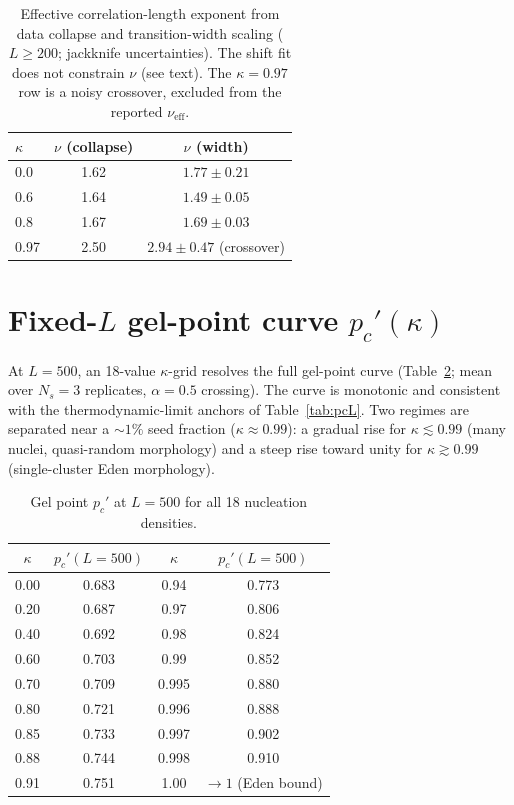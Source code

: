\documentclass[aps,prl,twocolumn,superscriptaddress,floatfix,nofootinbib]{revtex4-2}
\newcommand{\pcp}{p_c'}
\newcommand{\kap}{\kappa}
\newcommand{\nueff}{\nu_{\mathrm{eff}}}
\begin{document}
\begin{table}[h]
\centering
\caption{Effective correlation-length exponent from data collapse and transition-width scaling
($L\ge200$; jackknife uncertainties). The shift fit does not constrain $\nu$ (see text). The
$\kap=0.97$ row is a noisy crossover, excluded from the reported $\nueff$.}
\label{tab:nu}
\begin{tabular}{lcc}
\toprule
$\kap$ & $\nu$ (collapse) & $\nu$ (width) \\
\midrule
0.0  & 1.62 & $1.77\pm0.21$ \\
0.6  & 1.64 & $1.49\pm0.05$ \\
0.8  & 1.67 & $1.69\pm0.03$ \\
0.97 & 2.50 & $2.94\pm0.47$ \;(crossover) \\
\bottomrule
\end{tabular}
\end{table}

\section{Fixed-$L$ gel-point curve $\pcp(\kap)$}
At $L=500$, an 18-value $\kap$-grid resolves the full gel-point curve (Table~\ref{tab:kappa}; mean
over $N_s=3$ replicates, $\alpha=0.5$ crossing). The curve is monotonic and consistent with the
thermodynamic-limit anchors of Table~\ref{tab:pcL}. Two regimes are separated near a $\sim1\%$ seed
fraction ($\kap\approx0.99$): a gradual rise for $\kap\lesssim0.99$ (many nuclei, quasi-random
morphology) and a steep rise toward unity for $\kap\gtrsim0.99$ (single-cluster Eden morphology).

\begin{table}[h]
\centering
\caption{Gel point $\pcp$ at $L=500$ for all 18 nucleation densities.}
\label{tab:kappa}
\begin{tabular}{cc@{\hspace{2em}}cc}
\toprule
$\kap$ & $\pcp(L{=}500)$ & $\kap$ & $\pcp(L{=}500)$ \\
\midrule
0.00 & 0.683 & 0.94  & 0.773 \\
0.20 & 0.687 & 0.97  & 0.806 \\
0.40 & 0.692 & 0.98  & 0.824 \\
0.60 & 0.703 & 0.99  & 0.852 \\
0.70 & 0.709 & 0.995 & 0.880 \\
0.80 & 0.721 & 0.996 & 0.888 \\
0.85 & 0.733 & 0.997 & 0.902 \\
0.88 & 0.744 & 0.998 & 0.910 \\
0.91 & 0.751 & 1.00  & $\to1$ (Eden bound) \\
\bottomrule
\end{tabular}
\end{table}
\end{document}
